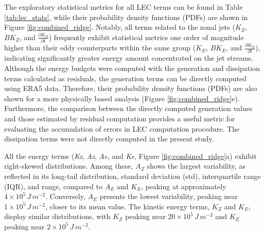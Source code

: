 \documentclass[pdflatex,sn-chicago]{sn-jnl}%
\theoremstyle{plain}
\theoremstyle{definition}
\theoremstyle{remark}
\theoremstyle{definition}
\begin{document}
The exploratory statistical metrics for all LEC terms can be found in Table \ref{tab:lec_stats}, while their probability density functions (PDFs) are shown in Figure \ref{fig:combined_ridge}. Notably, all terms related to the zonal jets ($K_Z$, $BK_Z$, and \(\frac{\partial K_Z}{\partial t}\)) frequently exhibit statistical metrics one order of magnitude higher than their eddy counterparts within the same group ($K_E$, $BK_E$, and \(\frac{\partial K_E}{\partial t}\)), indicating significantly greater energy amount concentrated on the jet streams. Although the energy budgets were computed with the generation and dissipation terms calculated as residuals, the generation terms can be directly computed using ERA5 data. Therefore, their probability density functions (PDFs) are also shown for a more physically based analysis (Figure \ref{fig:combined_ridge}e). Furthermore, the comparison between the directly computed generation values and those estimated by residual computation provides a useful metric for evaluating the accumulation of errors in LEC computation procedure. The dissipation terms were not directly computed in the present study.

All the energy terms (\textit{Kz}, \textit{Az}, \textit{Ae}, and \textit{Ke}, Figure \ref{fig:combined_ridge}a) exhibit right-skewed distributions. Among these, $A_Z$ shows the largest variability, as reflected in its long-tail distribution, standard deviation (std), interquartile range (IQR), and range, compared to $A_E$ and $K_E$, peaking at approximately $4 \times 10^5 \, J \, m^{-2}$. Conversely, $A_E$ presents the lowest variability, peaking near $1 \times 10^5 \, J \, m^{-2}$, closer to its mean value. The kinetic energy terms, $K_Z$ and $K_E$, display similar distributions, with $K_Z$ peaking near $20 \times 10^5 \, J \, m^{-2}$ and $K_E$ peaking near $2 \times 10^5 \, J \, m^{-2}$.
\end{document}
